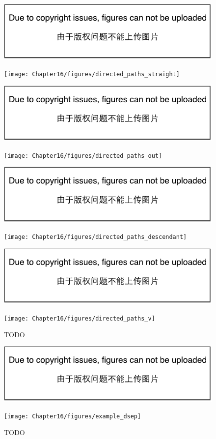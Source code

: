 \begin{figure}[!htb]
\ifOpenSource
\centerline{\includegraphics{figure.pdf}}
\else
	\centerline{\texttt{[image: Chapter16/figures/directed\_paths\_straight]}}	
\fi
\ifOpenSource
\centerline{\includegraphics{figure.pdf}}
\else
	\centerline{\texttt{[image: Chapter16/figures/directed\_paths\_out]}}
\fi
\ifOpenSource
\centerline{\includegraphics{figure.pdf}}
\else
	\centerline{\texttt{[image: Chapter16/figures/directed\_paths\_descendant]}}
\fi
\ifOpenSource
\centerline{\includegraphics{figure.pdf}}
\else
	\centerline{\texttt{[image: Chapter16/figures/directed\_paths\_v]}}		
\fi
	\caption{TODO}
	\label{fig:168}
\end{figure}

\begin{figure}[!htb]
\ifOpenSource
\centerline{\includegraphics{figure.pdf}}
\else
	\centerline{\texttt{[image: Chapter16/figures/example\_dsep]}}	
\fi
	\caption{TODO}
	\label{fig:169}
\end{figure}


